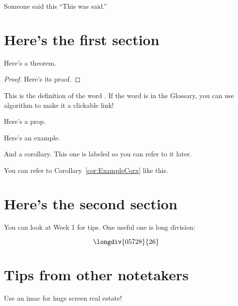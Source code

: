 \begin{chapquote}{Someone said this}
``This was said.''
\end{chapquote}

\section{Here's the first section}

\begin{theorem}
Here's a theorem.
\end{theorem}

\begin{proof}
Here's its proof.
\end{proof}

\begin{definition} This is the definition of the word .  If the word is in the Glossary, you can use \gls{algorithm} to make it a clickable link!
\end{definition}

\begin{proposition} Here's a prop.\end{proposition}

\begin{example} Here's an example. \end{example}

\begin{corollary}\label{cor:ExampleCorx} And a corollary.  This one is labeled so you can refer to it later.\end{corollary}

You can refer to Corollary~\ref{cor:ExampleCorx} like this.

\section{Here's the second section}
You can look at Week 1 for tips.  One useful one is long division:

\[
\longdiv{05728}{26}
\]

\section{Tips from other notetakers}

Use an imac for huge screen real estate!